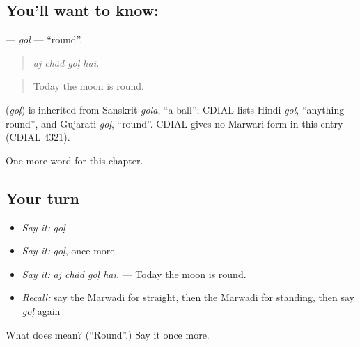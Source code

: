 \subsection*{You'll want to know: }
\textbf{} — \emph{goḷ} — \textquotedblleft{}round\textquotedblright{}.

\begin{quote}
   
\end{quote}

\begin{quote}
\emph{āj chā̃d goḷ hai.}
\end{quote}

\begin{quote}
Today the moon is round.
\end{quote}

\begin{cousinweb}
\textbf{} (\emph{goḷ}) is inherited from Sanskrit \emph{gola}, \textquotedblleft{}a ball\textquotedblright{}; CDIAL lists Hindi \emph{gol}, \textquotedblleft{}anything round\textquotedblright{}, and Gujarati \emph{goḷ}, \textquotedblleft{}round\textquotedblright{}. CDIAL gives no Marwari form in this entry (CDIAL 4321).
\end{cousinweb}

\begin{grammarlens}[title={What you've built}]
One more word for this chapter.
\end{grammarlens}

\subsection*{Your turn}
\begin{itemize}
\raggedright
  \item \emph{Say it:} \emph{goḷ}
  \item \emph{Say it:} \emph{goḷ}, once more
  \item \emph{Say it:} \emph{āj chā̃d goḷ hai.} — Today the moon is round.
  \item \emph{Recall:} say the Marwadi for straight, then the Marwadi for standing, then say \emph{goḷ} again
\end{itemize}

\begin{tcolorbox}[breakable,colback=teal!4,colframe=teal!35!black,title={Before you move on}]
What does  mean? (\textquotedblleft{}Round\textquotedblright{}.) Say it once more.
\end{tcolorbox}

